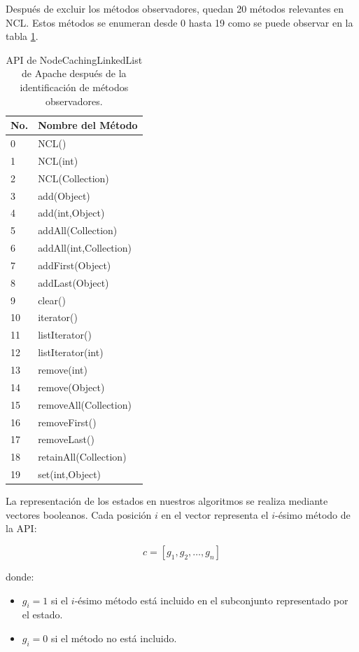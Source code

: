 Después de excluir los métodos observadores, quedan 20 métodos relevantes en NCL. Estos métodos se enumeran desde 0 hasta 19 como se puede observar en la tabla \ref{tab:ncl-api-infer}. 
\begin{table}[H]
\centering
{\scriptsize
\begin{tabular}{|l|l|}
\hline
No. & Nombre del Método \\
\hline
0  & NCL() \\
1  & NCL(int) \\
2  & NCL(Collection) \\
3  & add(Object) \\
4  & add(int,Object) \\
5  & addAll(Collection) \\
6  & addAll(int,Collection) \\
7  & addFirst(Object) \\
8  & addLast(Object) \\
9  & clear() \\
10 & iterator() \\
11 & listIterator() \\
12 & listIterator(int) \\
13 & remove(int) \\
14 & remove(Object) \\
15 & removeAll(Collection) \\
16 & removeFirst() \\
17 & removeLast() \\
18 & retainAll(Collection) \\
19 & set(int,Object) \\
\hline
\end{tabular}
}
\caption{API de NodeCachingLinkedList de Apache después de la identificación de métodos observadores.}
\label{tab:ncl-api-infer}
\end{table}


La representación de los estados en nuestros algoritmos se realiza mediante vectores booleanos. Cada posición $i$ en el vector representa el $i$-ésimo método de la API:

\[
c = [g_1, g_2, \ldots, g_n]
\]

donde:
\begin{itemize}
    \item $g_i = 1$ si el $i$-ésimo método está incluido en el subconjunto representado por el estado.
    \item $g_i = 0$ si el método no está incluido.
\end{itemize}

